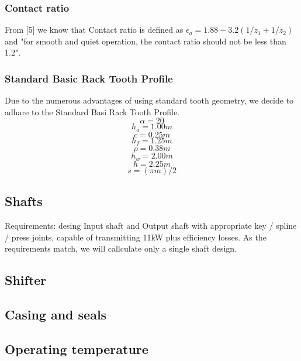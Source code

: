 \documentclass{article}
\begin{document}
\subsubsection{Contact ratio}
From [5] we know that Contact ratio is defined as
$\epsilon_a = 1.88 - 3.2 (1/z_1 + 1/z_2)$ %
and "for smooth and quiet operation, the contact ratio should not be less than 1.2".
\subsubsection{Standard Basic Rack Tooth Profile}
Due to the numerous advantages of using standard tooth geometry, we decide to adhare to the Standard Basi Rack Tooth Profile.
$$\alpha = 20$$  %
$$h_a = 1.00m$$ %
$$c = 0.25m$$ %
$$h_f = 1.25m$$ %
$$\rho = 0.38m$$ %
$$h_w = 2.00m$$ %
$$h = 2.25m$$ %
$$s = (\pi m)/ 2$$ %

\subsection{Shafts}
Requirements: desing Input shaft and Output shaft with appropriate key / spline / press  joints, capable of transmitting 11kW plus efficiency losses.
As the requirements match, we will callculate only a single shaft design.
\FPeval{}
\vExample

\subsection{Shifter}
\subsection{Casing and seals}
\subsection{Operating temperature}

\tableofcontents
\end{document}
